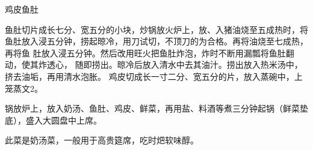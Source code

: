 \begin{recipe}{鸡皮鱼肚}

\ingredients


\preparation

\step 鱼肚切片成长七分、宽五分的小块，炒锅放火炉上，放、入猪油烧至五成热时，将
鱼肚放入浸五分钟，捞起晾冷，用刀试切，不顶刀的为合格。再将油烧至七成热，再将鱼
肚放入浸五分钟。然后改用旺火把鱼肚炸泡，炸时不断用漏瓢将鱼肚翻动，使其炸透心，
随即捞出。晾冷后放入清水中去其油汁。捞出放入热米汤中，挤去油垢，再用清水泡胀。
鸡皮切成长一寸二分、宽五分的片，放入蒸碗中，上笼蒸文2。

\step 锅放炉上，放入奶汤、鱼肚、鸡皮、鲜菜，再用盐、料酒等煮三分钟起锅（鲜菜垫
底），盛入大圆盘中上席。

\features

此菜是奶汤菜，一般用于高贵筵席，吃时𤆵软味醇。

\end{recipe}

